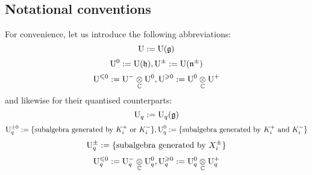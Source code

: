      \subsection{Notational conventions}
        For convenience, let us introduce the following abbreviations:
            $$\mathrm{U} := \mathrm{U}(\mathfrak{g})$$
            $$\mathrm{U}^0 := \mathrm{U}(\mathfrak{h}), \mathrm{U}^{\pm} := \mathrm{U}(\mathfrak{n}^{\pm})$$
            $$\rmU^{\leq 0} := \rmU^- \tensor_{\bbC} \rmU^0, \rmU^{\geq 0} := \rmU^0 \tensor_{\bbC} \rmU^+$$
        and likewise for their quantised counterparts:
            $$\mathrm{U}_q := \mathrm{U}_q(\mathfrak{g})$$
            $$\mathrm{U}_q^{\pm 0} := \{ \text{subalgebra generated by $K_i^+$ or $K_i^-$} \}, \mathrm{U}_q^0 := \{ \text{subalgebra generated by $K_i^+$ and $K_i^-$} \}$$
            $$\mathrm{U}_q^{\pm} := \{ \text{subalgebra generated by $X_i^{\pm}$} \}$$
            $$\rmU_q^{\leq 0} := \rmU_q^- \tensor_{\bbC} \rmU_q^0, \rmU_q^{\geq 0} := \rmU_q^0 \tensor_{\bbC} \rmU_q^+$$